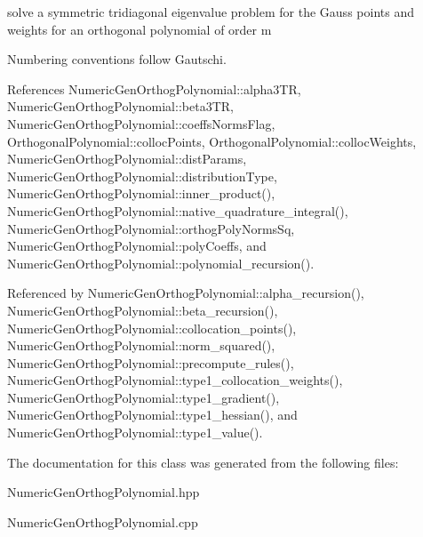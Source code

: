 solve a symmetric tridiagonal eigenvalue problem for the Gauss points and weights for an orthogonal polynomial of order m 

Numbering conventions follow Gautschi. 

References Numeric\+Gen\+Orthog\+Polynomial\+::alpha3\+TR, Numeric\+Gen\+Orthog\+Polynomial\+::beta3\+TR, Numeric\+Gen\+Orthog\+Polynomial\+::coeffs\+Norms\+Flag, Orthogonal\+Polynomial\+::colloc\+Points, Orthogonal\+Polynomial\+::colloc\+Weights, Numeric\+Gen\+Orthog\+Polynomial\+::dist\+Params, Numeric\+Gen\+Orthog\+Polynomial\+::distribution\+Type, Numeric\+Gen\+Orthog\+Polynomial\+::inner\+\_\+product(), Numeric\+Gen\+Orthog\+Polynomial\+::native\+\_\+quadrature\+\_\+integral(), Numeric\+Gen\+Orthog\+Polynomial\+::orthog\+Poly\+Norms\+Sq, Numeric\+Gen\+Orthog\+Polynomial\+::poly\+Coeffs, and Numeric\+Gen\+Orthog\+Polynomial\+::polynomial\+\_\+recursion().



Referenced by Numeric\+Gen\+Orthog\+Polynomial\+::alpha\+\_\+recursion(), Numeric\+Gen\+Orthog\+Polynomial\+::beta\+\_\+recursion(), Numeric\+Gen\+Orthog\+Polynomial\+::collocation\+\_\+points(), Numeric\+Gen\+Orthog\+Polynomial\+::norm\+\_\+squared(), Numeric\+Gen\+Orthog\+Polynomial\+::precompute\+\_\+rules(), Numeric\+Gen\+Orthog\+Polynomial\+::type1\+\_\+collocation\+\_\+weights(), Numeric\+Gen\+Orthog\+Polynomial\+::type1\+\_\+gradient(), Numeric\+Gen\+Orthog\+Polynomial\+::type1\+\_\+hessian(), and Numeric\+Gen\+Orthog\+Polynomial\+::type1\+\_\+value().



The documentation for this class was generated from the following files\+:\begin{DoxyCompactItemize}
\item 
Numeric\+Gen\+Orthog\+Polynomial.\+hpp\item 
Numeric\+Gen\+Orthog\+Polynomial.\+cpp\end{DoxyCompactItemize}
